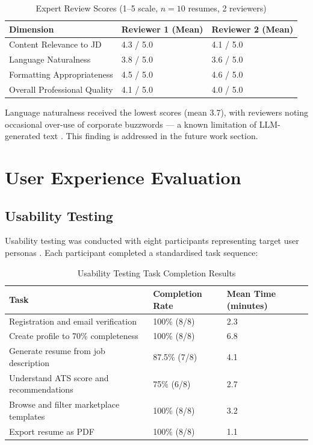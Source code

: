 \documentclass[12pt, a4paper, oneside]{report}
\begin{document}
\begin{table}[H]
\centering
\caption{Expert Review Scores (1--5 scale, $n=10$ resumes, 2 reviewers)}
\label{tab:expert_review}
\renewcommand{\arraystretch}{1.4}
\begin{tabularx}{\textwidth}{|X|p{3cm}|p{3cm}|}
\hline
\textbf{Dimension} & \textbf{Reviewer 1 (Mean)} & \textbf{Reviewer 2 (Mean)} \\
\hline
Content Relevance to JD & 4.3 / 5.0 & 4.1 / 5.0 \\
\hline
Language Naturalness \cite{brown2020} & 3.8 / 5.0 & 3.6 / 5.0 \\
\hline
Formatting Appropriateness & 4.5 / 5.0 & 4.6 / 5.0 \\
\hline
Overall Professional Quality & 4.1 / 5.0 & 4.0 / 5.0 \\
\hline
\end{tabularx}
\end{table}

Language naturalness received the lowest scores (mean 3.7), with reviewers noting occasional over-use of corporate buzzwords --- a known limitation of LLM-generated text \cite{brown2020}. This finding is addressed in the future work section.

\section{User Experience Evaluation}

\subsection{Usability Testing}

Usability testing was conducted with eight participants representing target user personas \cite{sus1996}. Each participant completed a standardised task sequence:

\begin{table}[H]
\centering
\caption{Usability Testing Task Completion Results}
\label{tab:usability}
\renewcommand{\arraystretch}{1.4}
\begin{tabularx}{\textwidth}{|X|p{3cm}|p{4cm}|}
\hline
\textbf{Task} & \textbf{Completion Rate} & \textbf{Mean Time (minutes)} \\
\hline
Registration and email verification & 100\% (8/8) & 2.3 \\
\hline
Create profile to 70\% completeness & 100\% (8/8) & 6.8 \\
\hline
Generate resume from job description & 87.5\% (7/8) & 4.1 \\
\hline
Understand ATS score and recommendations & 75\% (6/8) & 2.7 \\
\hline
Browse and filter marketplace templates & 100\% (8/8) & 3.2 \\
\hline
Export resume as PDF & 100\% (8/8) & 1.1 \\
\hline
\end{tabularx}
\end{table}
\end{document}
